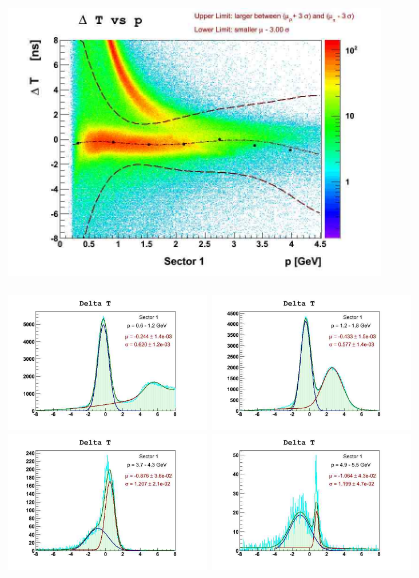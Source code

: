 \begin{figure}[ht]
  \centering
		\includegraphics[width=0.88\textwidth ]{img/dt_fit_sect1.jpg}
		
		\includegraphics[width=0.47\textwidth]{img/slice2_fit_sect1.jpg}
		\includegraphics[width=0.47\textwidth]{img/slice3_fit_sect1.jpg}
		\includegraphics[width=0.47\textwidth]{img/slice7_fit_sect1.jpg}
		\includegraphics[width=0.47\textwidth]{img/slice9_fit_sect1.jpg}
		

\end{figure}
